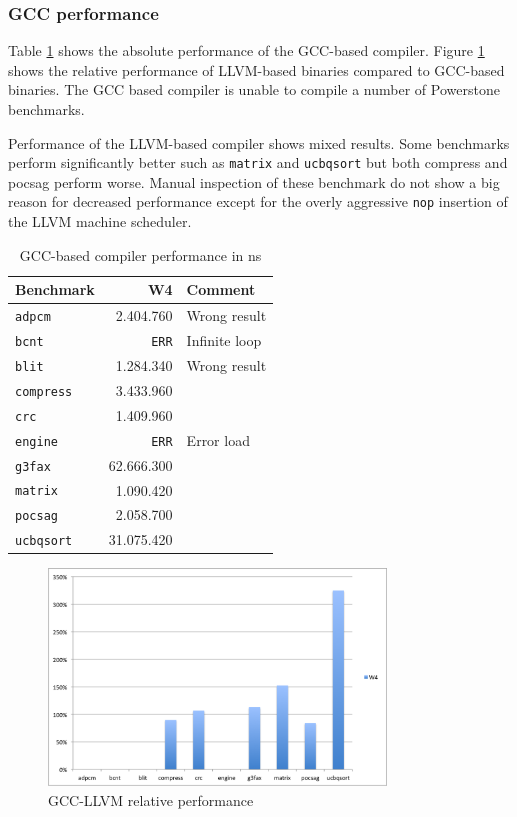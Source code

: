 \subsubsection{GCC performance}
Table \ref{tbl:GCC_perf} shows the absolute performance of the GCC-based compiler. Figure \ref{fig:rel_GCC} shows the relative performance of LLVM-based binaries compared to GCC-based binaries. The GCC based compiler is unable to compile a number of Powerstone benchmarks. 

Performance of the LLVM-based compiler shows mixed results. Some benchmarks perform significantly better such as \texttt{matrix} and \texttt{ucbqsort} but both compress and pocsag perform worse. Manual inspection of these benchmark do not show a big reason for decreased performance except for the overly aggressive \texttt{nop} insertion of the LLVM machine scheduler.

\begin{table}
  \centering
    \begin{tabular}{|l|r|l|}
    \hline
    \textbf{Benchmark} & \multicolumn{1}{|r|}{\textbf{W4}} & \textbf{Comment} \\ \hline
	\texttt{adpcm} 		& 2.404.760 	&	Wrong result 	\\ \hline
	\texttt{bcnt} 		& \texttt{ERR}	&	Infinite loop	\\ \hline
	\texttt{blit} 		& 1.284.340 	&	Wrong result 	\\ \hline
	\texttt{compress} 	& 3.433.960 	&	\\ \hline
	\texttt{crc} 		& 1.409.960 	&	\\ \hline
	\texttt{engine} 	& \texttt{ERR}	&	Error load		\\ \hline
	\texttt{g3fax} 		& 62.666.300 	&	\\ \hline
	\texttt{matrix} 	& 1.090.420 	&	\\ \hline
	\texttt{pocsag} 	& 2.058.700 	&	\\ \hline
	\texttt{ucbqsort} 	& 31.075.420 	&	\\ \hline
    \end{tabular}
  \caption{GCC-based compiler performance in ns}
  \label{tbl:GCC_perf}
\end{table}


\begin{figure}[ht]
\centering
\includegraphics[width=0.8\textwidth]{5_results/img/rel_GCC.png}
\caption{GCC-LLVM relative performance}
\label{fig:rel_GCC}
\end{figure}


